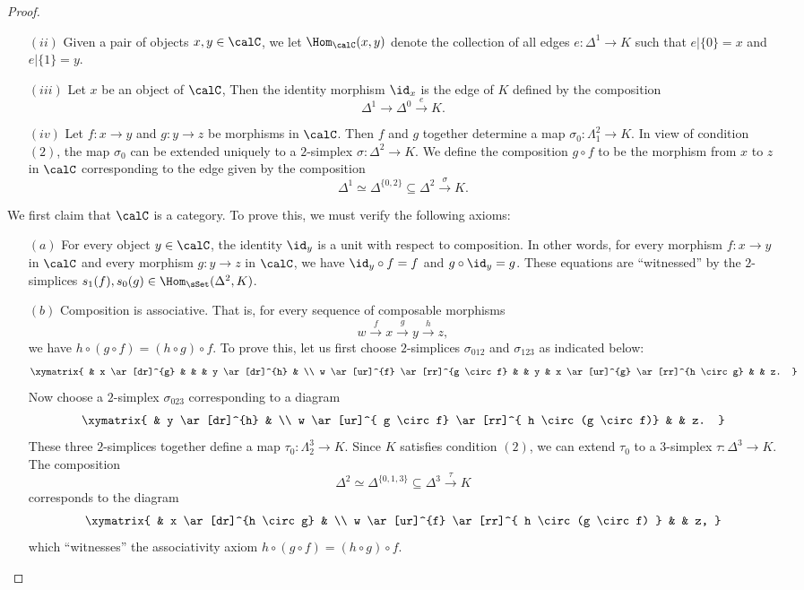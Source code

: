 \begin{proof}
\begin{itemize}
\item[$(ii)$] Given a pair of objects $x, y \in \calC$, we let
$\Hom_{\calC}(x,y)$ denote the collection of all edges
$e: \Delta^1 \rightarrow K$ such that $e|\{0\} =x$ and $e| \{1\} = y$.

\item[$(iii)$] Let $x$ be an object of $\calC$, Then the identity morphism
$\id_{x}$ is the edge of $K$ defined by the composition
$$ \Delta^1 \rightarrow \Delta^0 \stackrel{e}{\rightarrow} K.$$

\item[$(iv)$] Let $f: x \rightarrow y$ and $g: y \rightarrow z$ be morphisms
in $\calC$. Then $f$ and $g$ together determine a map
$\sigma_0: \Lambda^2_1 \rightarrow K$. In view of condition $(2)$, the map
$\sigma_0$ can be extended uniquely to a $2$-simplex $\sigma: \Delta^2 \rightarrow K$.
We define the composition $g \circ f$ to be the morphism from $x$ to $z$ in $\calC$ corresponding
to the edge given by the composition
$$ \Delta^1 \simeq \Delta^{ \{0,2\} } \subseteq \Delta^2 \stackrel{\sigma}{\rightarrow} K.$$
\end{itemize}

We first claim that $\calC$ is a category. To prove this, we must verify the following axioms:
\begin{itemize}
\item[$(a)$] For every object $y \in \calC$, the identity $\id_{y}$ is a unit with respect to composition.
In other words, for every morphism $f: x \rightarrow y$ in $\calC$ and every morphism
$g: y \rightarrow z$ in $\calC$, we have $\id_y \circ f = f$ and $g \circ \id_y = g$.
These equations are ``witnessed'' by the $2$-simplices $s_1(f), s_0(g) \in \Hom_{\sSet}( \Delta^2, K)$.

\item[$(b)$] Composition is associative. That is, for every sequence of composable morphisms
$$ w \stackrel{f}{\rightarrow} x \stackrel{g}{\rightarrow} y \stackrel{h}{\rightarrow} z,$$
we have $h \circ (g \circ f) = (h \circ g) \circ f$. To prove this, let us first choose
$2$-simplices $\sigma_{0 1 2}$ and $\sigma_{1 2 3}$ as indicated below:
$$ \xymatrix{ & x \ar[dr]^{g} & & & y \ar[dr]^{h} & \\
w \ar[ur]^{f} \ar[rr]^{g \circ f} & & y & x \ar[ur]^{g} \ar[rr]^{h \circ g} & & z. }$$
Now choose a $2$-simplex $\sigma_{0 2 3}$ corresponding to a diagram
$$ \xymatrix{ & y \ar[dr]^{h} & \\
w \ar[ur]^{ g \circ f} \ar[rr]^{ h \circ (g \circ f)} &  & z. }$$
These three $2$-simplices together define a map $\tau_0: \Lambda^3_2 \rightarrow K$.
Since $K$ satisfies condition $(2)$, we can extend $\tau_0$ to a $3$-simplex
$\tau: \Delta^3 \rightarrow K$. The composition
$$ \Delta^2 \simeq \Delta^{ \{0,1,3\}} \subseteq \Delta^3 \stackrel{\tau}{\rightarrow} K$$
corresponds to the diagram
$$ \xymatrix{ & x \ar[dr]^{h \circ g} & \\
w \ar[ur]^{f} \ar[rr]^{ h \circ (g \circ f) } & & z, }$$
which ``witnesses'' the associativity axiom $h \circ (g \circ f) = (h \circ g) \circ f$.
\end{itemize}


\end{proof}
